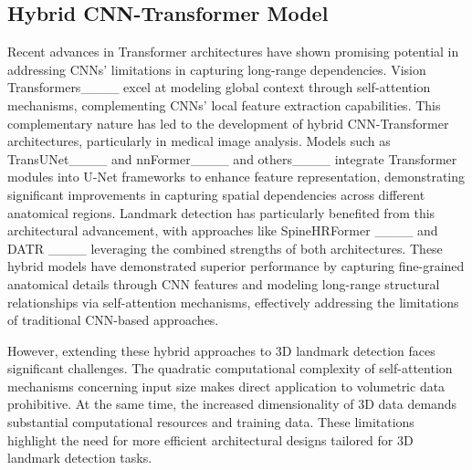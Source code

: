 \subsection{Hybrid CNN-Transformer Model}
Recent advances in Transformer architectures have shown promising potential in addressing CNNs' limitations in capturing long-range dependencies. Vision Transformers____ excel at modeling global context through self-attention mechanisms, complementing CNNs' local feature extraction capabilities. This complementary nature has led to the development of hybrid CNN-Transformer architectures, particularly in medical image analysis. Models such as TransUNet____ and nnFormer____ and others____ integrate Transformer modules into U-Net frameworks to enhance feature representation, demonstrating significant improvements in capturing spatial dependencies across different anatomical regions. Landmark detection has particularly benefited from this architectural advancement, with approaches like SpineHRFormer ____ and DATR ____ leveraging the combined strengths of both architectures. These hybrid models have demonstrated superior performance by capturing fine-grained anatomical details through CNN features and modeling long-range structural relationships via self-attention mechanisms, effectively addressing the limitations of traditional CNN-based approaches.

However, extending these hybrid approaches to 3D landmark detection faces significant challenges. The quadratic computational complexity of self-attention mechanisms concerning input size makes direct application to volumetric data prohibitive. At the same time, the increased dimensionality of 3D data demands substantial computational resources and training data. These limitations highlight the need for more efficient architectural designs tailored for 3D landmark detection tasks.